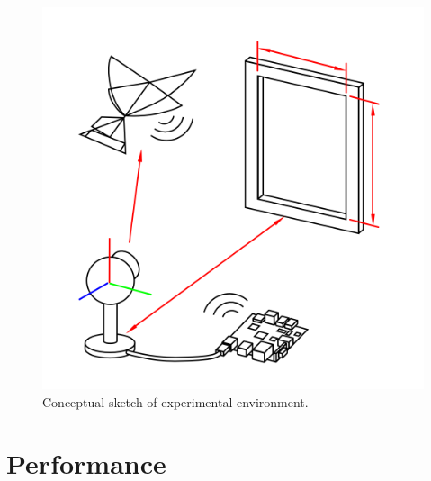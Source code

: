 \documentclass{aamas2013}
\begin{document}
\begin{figure}[tb]
\centering
\includegraphics[width=\linewidth]{figures/experiment_cartoon.png}
\caption{Conceptual sketch of experimental environment.}
\label{fig:experiment_sketch}
\end{figure}


\section{Performance}

\end{document}
